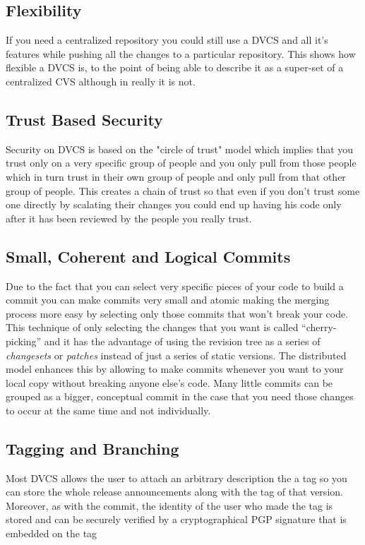 \subsection{Flexibility}
If you need a centralized repository you could still use a DVCS and all it's features while pushing all the changes to a particular repository. This shows how flexible a DVCS is, to the point of being able to describe it as a super-set of a centralized CVS although in really it is not.

\subsection{Trust Based Security}
Security on DVCS is based on the "circle of trust" model which implies that you trust only on a very specific group of people and you only pull from those people which in turn trust in their own group of people and only pull from that other group of people. This creates a chain of trust so that even if you don't trust some one directly by scalating their changes you could end up having his code only after it has been reviewed by the people you really trust.

\subsection{Small, Coherent and Logical Commits}
Due to the fact that you can select very specific pieces of your code to build a commit you can make commits very small and atomic making the merging process more easy by selecting only those commits that won't break your code. This technique of only selecting the changes that you want is called ``cherry-picking'' and it has the advantage of using the revision tree as a 
series of \emph{changesets} or \emph{patches} instead of just a series of static versions. The distributed model enhances this by allowing to make commits whenever you want to your local copy without breaking anyone else's code. Many little commits can be grouped as a bigger, conceptual commit in the case that you need those changes to occur at the same time and not individually. 

\subsection{Tagging and Branching}
Most DVCS allows the user to attach an arbitrary description the a tag so you can store the whole release announcements along with the tag of that version. Moreover, as with the commit, the identity of the user who made the tag is stored and can be securely verified by a cryptographical PGP signature that is embedded on the tag

